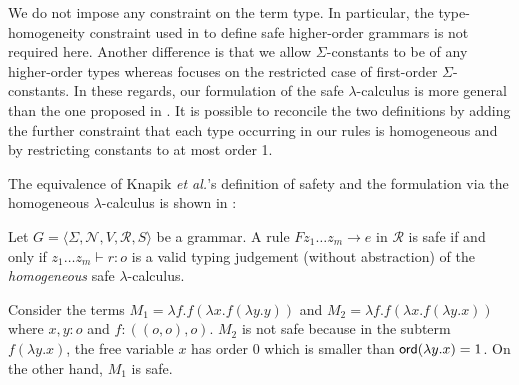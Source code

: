 \documentclass{llncs}
\newcommand\dps{\displaystyle}
\newcommand\rulef[2]{\frac{\dps #1}{\dps #2}}
\newcommand\ord[1]{{\sf ord}(#1)}
\begin{document}
We do not impose any constraint on the term type. In particular, the type-homogeneity constraint used in \cite{KNU02} to define safe higher-order grammars is not required here. Another difference is that we allow $\Sigma$-constants to be of any higher-order types whereas \cite{KNU02} focuses on the restricted case of first-order $\Sigma$-constants.
In these regards, our formulation of the safe $\lambda$-calculus is more general than the one proposed in \cite{safety-mirlong2004}.
It is possible to reconcile the two definitions by adding the further constraint that each type occurring in our rules is homogeneous
and by restricting constants to at most order 1.

The equivalence of Knapik \emph{et al.}'s definition of safety and
the formulation via the homogeneous $\lambda$-calculus is shown in \cite{demirandathesis}:
\begin{proposition} Let $G = \langle \Sigma, \mathcal{N}, V, \mathcal{R}, S \rangle$ be a grammar.
A rule $F z_1 \ldots z_m \rightarrow e$ in $\mathcal{R}$ is safe if and only if
$ z_1 \ldots z_m \vdash r : o$
is a valid typing judgement (without abstraction) of the \emph{homogeneous} safe $\lambda$-calculus.
\end{proposition}



\begin{example}
\label{ex:kierstead}
Consider the terms $M_1 = \lambda f . f (\lambda x . f (\lambda y . y ))$ and
$M_2 = \lambda f . f (\lambda x . f (\lambda y .x ))$ where $x,y:o$ and $f:((o,o),o)$.
$M_2$ is not safe because in the subterm $f (\lambda y . x)$, the free variable $x$ has order $0$ which is smaller than $\ord{\lambda y . x} = 1$.
On the other hand, $M_1$ is safe.
\end{example}
\end{document}
